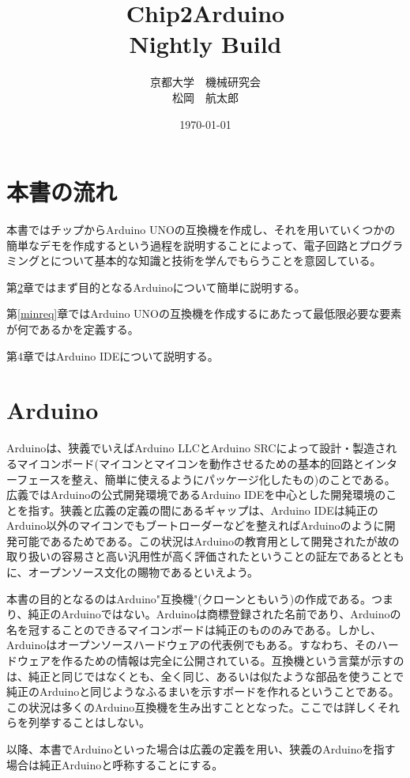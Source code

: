 \documentclass[a4paper,titlepage,here]{ujarticle}
\title{Chip2Arduino \\Nightly Build}
\date{\today}
\author{京都大学　機械研究会\\ 松岡　航太郎}
\begin{document}
\maketitle
\begin{multicols}{2}
\tableofcontents
\end{multicols}
\section{本書の流れ}
本書ではチップからArduino UNOの互換機を作成し、それを用いていくつかの簡単なデモを作成するという過程を説明することによって、電子回路とプログラミングとについて基本的な知識と技術を学んでもらうことを意図している。

第\ref{ardis}章ではまず目的となるArduinoについて簡単に説明する。

第\ref{minreq}章ではArduino UNOの互換機を作成するにあたって最低限必要な要素が何であるかを定義する。

第4章ではArduino IDEについて説明する。
\section{Arduino}\label{ardis}
Arduinoは、狭義でいえばArduino LLCとArduino SRCによって設計・製造されるマイコンボード(マイコンとマイコンを動作させるための基本的回路とインターフェースを整え、簡単に使えるようにパッケージ化したもの)のことである。広義ではArduinoの公式開発環境であるArduino IDEを中心とした開発環境のことを指す。狭義と広義の定義の間にあるギャップは、Arduino IDEは純正のArduino以外のマイコンでもブートローダーなどを整えればArduinoのように開発可能であるためである。この状況はArduinoの教育用として開発されたが故の取り扱いの容易さと高い汎用性が高く評価されたということの証左であるとともに、オープンソース文化の賜物であるといえよう。

本書の目的となるのはArduino"互換機"(クローンともいう)の作成である。つまり、純正のArduinoではない。Arduinoは商標登録された名前であり、Arduinoの名を冠することのできるマイコンボードは純正のもののみである。しかし、Arduinoはオープンソースハードウェアの代表例でもある。すなわち、そのハードウェアを作るための情報は完全に公開されている。互換機という言葉が示すのは、純正と同じではなくとも、全く同じ、あるいは似たような部品を使うことで純正のArduinoと同じようなふるまいを示すボードを作れるということである。この状況は多くのArduino互換機を生み出すこととなった。ここでは詳しくそれらを列挙することはしない。

以降、本書でArduinoといった場合は広義の定義を用い、狭義のArduinoを指す場合は純正Arduinoと呼称することにする。
\end{document}
